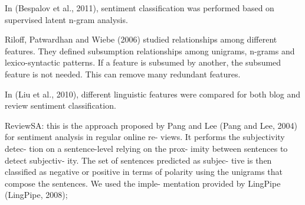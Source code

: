 











In (Bespalov et al., 2011), sentiment classification was performed
based on supervised latent n-gram analysis.



Riloff, Patwardhan and Wiebe (2006) studied relationships among
different features. They defined subsumption relationships among
unigrams, n-grams and lexico-syntactic patterns. If a feature is
subsumed by another, the subsumed feature is not needed. This can
remove many redundant features.

In (Liu et al., 2010), different linguistic features were compared for
both blog and review sentiment classification.


ReviewSA: this is the approach proposed by Pang and Lee (Pang and Lee,
2004) for sentiment analysis in regular online re- views. It performs
the subjectivity detec- tion on a sentence-level relying on the prox-
imity between sentences to detect subjectiv- ity. The set of sentences
predicted as subjec- tive is then classified as negative or positive
in terms of polarity using the unigrams that compose the sentences. We
used the imple- mentation provided by LingPipe (LingPipe, 2008);



\todo[inline]{}


